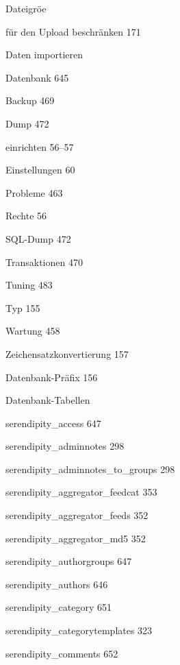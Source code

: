 \documentclass{book}
\renewcommand\subitem{\par}
\begin{document}
\begin{multicols}{2}
\begin{osp-index}
  \item Dateigr\"o\IeC {\ss }e
    \subitem f\"ur den Upload beschr\"anken\hspace{1mm} 171
  \item Daten importieren\hspace{1mm} 
  \item Datenbank\hspace{1mm} 645
    \subitem Backup\hspace{1mm} 469
    \subitem Dump\hspace{1mm} 472
    \subitem einrichten\hspace{1mm} 56--57
    \subitem Einstellungen\hspace{1mm} 60
    \subitem Probleme\hspace{1mm} 463
    \subitem Rechte\hspace{1mm} 56
    \subitem SQL-Dump\hspace{1mm} 472
    \subitem Transaktionen\hspace{1mm} 470
    \subitem Tuning\hspace{1mm} 483
    \subitem Typ\hspace{1mm} 155
    \subitem Wartung\hspace{1mm} 458
    \subitem Zeichensatzkonvertierung\hspace{1mm} 157
  \item Datenbank-Pr\"afix\hspace{1mm} 156
  \item Datenbank-Tabellen
    \subitem serendipity\_access\hspace{1mm} 647
    \subitem serendipity\_adminnotes\hspace{1mm} 298
    \subitem serendipity\_adminnotes\_to\_groups\hspace{1mm} 298
    \subitem serendipity\_aggregator\_feedcat\hspace{1mm} 353
    \subitem serendipity\_aggregator\_feeds\hspace{1mm} 352
    \subitem serendipity\_aggregator\_md5\hspace{1mm} 352
    \subitem serendipity\_authorgroups\hspace{1mm} 647
    \subitem serendipity\_authors\hspace{1mm} 646
    \subitem serendipity\_category\hspace{1mm} 651
    \subitem serendipity\_categorytemplates\hspace{1mm} 323
    \subitem serendipity\_comments\hspace{1mm} 652

\end{osp-index}
\end{multicols}
\end{document}
